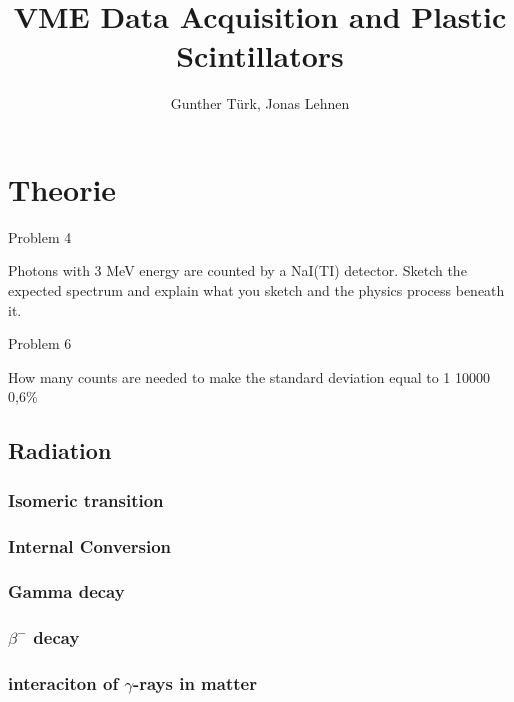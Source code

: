 \documentclass[]{article}
\title{VME Data Acquisition and Plastic Scintillators}
\author{Gunther T\"urk, Jonas Lehnen}
\begin{document}
\maketitle
\begin{abstract}


\end{abstract}

\tableofcontents

\newpage
\section{Theorie}








Problem 4 

Photons with 3 MeV energy are counted by a NaI(TI) detector. Sketch the expected spectrum and explain what you sketch and the physics process beneath it. 


Problem 6 

How many counts are needed to make the standard deviation equal to 1%
10000
0,6\%

\subsection{Radiation}\label{radiation}

\subsubsection{Isomeric transition}
\subsubsection{Internal Conversion}
\subsubsection{Gamma decay}
\subsubsection{$\beta^-$ decay}
\subsubsection{interaciton of $\gamma$-rays in matter}
\end{document}
